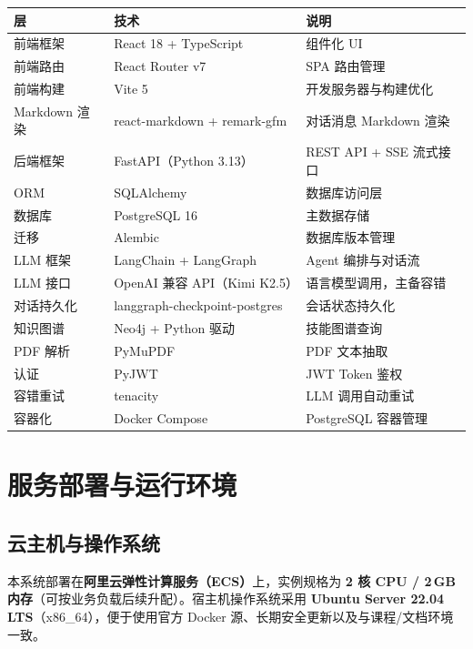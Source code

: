 \documentclass[12pt,a4paper]{ctexart}
\begin{document}
\begin{center}
\renewcommand{\arraystretch}{1.35}
\begin{tabular}{L{2.8cm} L{4.5cm} L{5.4cm}}
\toprule
\textbf{层} & \textbf{技术} & \textbf{说明} \\
\midrule
前端框架 & React 18 + TypeScript & 组件化 UI \\
前端路由 & React Router v7 & SPA 路由管理 \\
前端构建 & Vite 5 & 开发服务器与构建优化 \\
Markdown 渲染 & react-markdown + remark-gfm & 对话消息 Markdown 渲染 \\
后端框架 & FastAPI（Python 3.13） & REST API + SSE 流式接口 \\
ORM & SQLAlchemy & 数据库访问层 \\
数据库 & PostgreSQL 16 & 主数据存储 \\
迁移 & Alembic & 数据库版本管理 \\
LLM 框架 & LangChain + LangGraph & Agent 编排与对话流 \\
LLM 接口 & OpenAI 兼容 API（Kimi K2.5） & 语言模型调用，主备容错 \\
对话持久化 & langgraph-checkpoint-postgres & 会话状态持久化 \\
知识图谱 & Neo4j + Python 驱动 & 技能图谱查询 \\
PDF 解析 & PyMuPDF & PDF 文本抽取 \\
认证 & PyJWT & JWT Token 鉴权 \\
容错重试 & tenacity & LLM 调用自动重试 \\
容器化 & Docker Compose & PostgreSQL 容器管理 \\
\bottomrule
\end{tabular}
\end{center}

\section{服务部署与运行环境}

\subsection{云主机与操作系统}

本系统部署在\textbf{阿里云弹性计算服务（ECS）}上，实例规格为 \textbf{2 核 CPU / 2\,GB 内存}（可按业务负载后续升配）。宿主机操作系统采用 \textbf{Ubuntu Server 22.04 LTS}（x86\_64），便于使用官方 Docker 源、长期安全更新以及与课程/文档环境一致。
\end{document}
